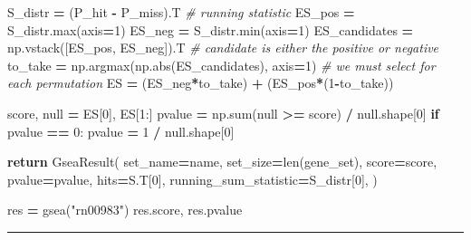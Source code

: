 \documentclass[
]{book}
\newenvironment{Shaded}{\begin{snugshade}}{\end{snugshade}}
\newcommand{\BuiltInTok}[1]{#1}
\newcommand{\CommentTok}[1]{\textcolor[rgb]{0.56,0.35,0.01}{\textit{#1}}}
\newcommand{\ControlFlowTok}[1]{\textcolor[rgb]{0.13,0.29,0.53}{\textbf{#1}}}
\newcommand{\DecValTok}[1]{\textcolor[rgb]{0.00,0.00,0.81}{#1}}
\newcommand{\NormalTok}[1]{#1}
\newcommand{\OperatorTok}[1]{\textcolor[rgb]{0.81,0.36,0.00}{\textbf{#1}}}
\newcommand{\StringTok}[1]{\textcolor[rgb]{0.31,0.60,0.02}{#1}}
\begin{document}
\begin{Shaded}
\begin{Highlighting}[numbers=left,,]
\NormalTok{    S\_distr }\OperatorTok{=}\NormalTok{ (P\_hit }\OperatorTok{{-}}\NormalTok{ P\_miss).T }\CommentTok{\# running statistic}
\NormalTok{    ES\_pos }\OperatorTok{=}\NormalTok{ S\_distr.}\BuiltInTok{max}\NormalTok{(axis}\OperatorTok{=}\DecValTok{1}\NormalTok{)}
\NormalTok{    ES\_neg }\OperatorTok{=}\NormalTok{ S\_distr.}\BuiltInTok{min}\NormalTok{(axis}\OperatorTok{=}\DecValTok{1}\NormalTok{)}
\NormalTok{    ES\_candidates }\OperatorTok{=}\NormalTok{ np.vstack([ES\_pos, ES\_neg]).T       }\CommentTok{\# candidate is either the positive or negative}
\NormalTok{    to\_take }\OperatorTok{=}\NormalTok{ np.argmax(np.}\BuiltInTok{abs}\NormalTok{(ES\_candidates), axis}\OperatorTok{=}\DecValTok{1}\NormalTok{)  }\CommentTok{\# we must select for each permutation}
\NormalTok{    ES }\OperatorTok{=}\NormalTok{ (ES\_neg}\OperatorTok{*}\NormalTok{to\_take) }\OperatorTok{+}\NormalTok{ (ES\_pos}\OperatorTok{*}\NormalTok{(}\DecValTok{1}\OperatorTok{{-}}\NormalTok{to\_take))}

\NormalTok{    score, null }\OperatorTok{=}\NormalTok{ ES[}\DecValTok{0}\NormalTok{], ES[}\DecValTok{1}\NormalTok{:]}
\NormalTok{    pvalue }\OperatorTok{=}\NormalTok{ np.}\BuiltInTok{sum}\NormalTok{(null }\OperatorTok{\textgreater{}=}\NormalTok{ score) }\OperatorTok{/}\NormalTok{ null.shape[}\DecValTok{0}\NormalTok{]}
    \ControlFlowTok{if}\NormalTok{ pvalue }\OperatorTok{==} \DecValTok{0}\NormalTok{:}
\NormalTok{        pvalue }\OperatorTok{=} \DecValTok{1} \OperatorTok{/}\NormalTok{ null.shape[}\DecValTok{0}\NormalTok{]}

    \ControlFlowTok{return}\NormalTok{ GseaResult(}
\NormalTok{        set\_name}\OperatorTok{=}\NormalTok{name,}
\NormalTok{        set\_size}\OperatorTok{=}\BuiltInTok{len}\NormalTok{(gene\_set),}
\NormalTok{        score}\OperatorTok{=}\NormalTok{score,}
\NormalTok{        pvalue}\OperatorTok{=}\NormalTok{pvalue,}
\NormalTok{        hits}\OperatorTok{=}\NormalTok{S.T[}\DecValTok{0}\NormalTok{],}
\NormalTok{        running\_sum\_statistic}\OperatorTok{=}\NormalTok{S\_distr[}\DecValTok{0}\NormalTok{],}
\NormalTok{    )}

\NormalTok{res }\OperatorTok{=}\NormalTok{ gsea(}\StringTok{"rn00983"}\NormalTok{)}
\NormalTok{res.score, res.pvalue}
\end{Highlighting}
\end{Shaded}

\begin{center}\rule{0.5\linewidth}{0.5pt}\end{center}
\end{document}
